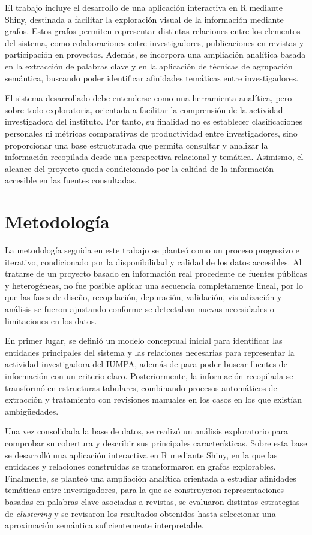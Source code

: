 \documentclass[11pt,spanish,listoffigures,listoftables]{tfgetsinf}
\begin{document}
El trabajo incluye el desarrollo de una aplicación interactiva en R mediante Shiny, destinada a facilitar la exploración visual de la información mediante grafos. Estos grafos permiten representar distintas relaciones entre los elementos del sistema, como colaboraciones entre investigadores, publicaciones en revistas y participación en proyectos. Además, se incorpora una ampliación analítica basada en la extracción de palabras clave y en la aplicación de técnicas de agrupación semántica, buscando poder identificar afinidades temáticas entre investigadores.

El sistema desarrollado debe entenderse como una herramienta analítica, pero sobre todo exploratoria, orientada a facilitar la comprensión de la actividad investigadora del instituto. Por tanto, su finalidad no es establecer clasificaciones personales ni métricas comparativas de productividad entre investigadores, sino proporcionar una base estructurada que permita consultar y analizar la información recopilada desde una perspectiva relacional y temática. Asimismo, el alcance del proyecto queda condicionado por la calidad de la información accesible en las fuentes consultadas.

\section{Metodología}

La metodología seguida en este trabajo se planteó como un proceso progresivo e iterativo, condicionado por la disponibilidad y calidad de los datos accesibles. Al tratarse de un proyecto basado en información real procedente de fuentes públicas y heterogéneas, no fue posible aplicar una secuencia completamente lineal, por lo que las fases de diseño, recopilación, depuración, validación, visualización y análisis se fueron ajustando conforme se detectaban nuevas necesidades o limitaciones en los datos.

En primer lugar, se definió un modelo conceptual inicial para identificar las entidades principales del sistema y las relaciones necesarias para representar la actividad investigadora del IUMPA, además de para poder buscar fuentes de información con un criterio claro. Posteriormente, la información recopilada se transformó en estructuras tabulares, combinando procesos automáticos de extracción y tratamiento con revisiones manuales en los casos en los que existían ambigüedades.

Una vez consolidada la base de datos, se realizó un análisis exploratorio para comprobar su cobertura y describir sus principales características. Sobre esta base se desarrolló una aplicación interactiva en R mediante Shiny, en la que las entidades y relaciones construidas se transformaron en grafos explorables. Finalmente, se planteó una ampliación analítica orientada a estudiar afinidades temáticas entre investigadores, para la que se construyeron representaciones basadas en palabras clave asociadas a revistas, se evaluaron distintas estrategias de \textit{clustering} y se revisaron los resultados obtenidos hasta seleccionar una aproximación semántica suficientemente interpretable.
\end{document}
